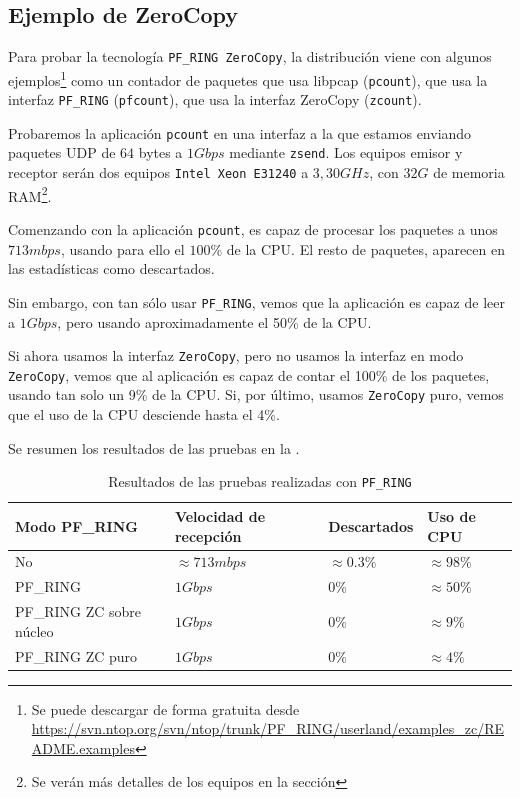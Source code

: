 \subsection{Ejemplo de ZeroCopy}
Para probar la tecnología \texttt{PF\_RING ZeroCopy}, la distribución viene con algunos ejemplos\footnote{Se puede 
descargar de forma gratuita desde 
\url{https://svn.ntop.org/svn/ntop/trunk/PF_RING/userland/examples_zc/README.examples}} como un contador de paquetes 
que usa libpcap (\texttt{pcount}), que usa la interfaz \texttt{PF\_RING} (\texttt{pfcount}), que usa 
la interfaz ZeroCopy (\texttt{zcount}).

Probaremos la aplicación \texttt{pcount} en una interfaz a la que estamos enviando paquetes UDP de $64$ bytes a $1Gbps$ 
mediante \texttt{zsend}. Los equipos emisor y receptor serán dos equipos \texttt{Intel\textregistered{} 
Xeon\textregistered{} E31240} a $3,30GHz$, con $32G$ de memoria RAM\footnote{Se verán más detalles de los equipos en la 
sección }.

Comenzando con la aplicación \texttt{pcount}, es capaz de procesar los paquetes a unos $713mbps$, usando para ello el 
$100\%$ de la CPU. El resto de paquetes,  aparecen en las estadísticas como descartados.

Sin embargo, con tan sólo usar \texttt{PF\_RING}, vemos que la aplicación es capaz de leer a $1Gbps$, pero usando 
aproximadamente el 50\% de la CPU.

Si ahora usamos la interfaz \texttt{ZeroCopy}, pero no usamos la interfaz en modo \texttt{ZeroCopy}, vemos que al 
aplicación es capaz de contar el 100\% de los paquetes, usando tan solo un 9\% de la CPU. Si, por último, usamos 
\texttt{ZeroCopy} puro, vemos que el uso de la CPU desciende hasta el 4\%.

Se resumen los resultados de las pruebas en la .

\begin{table}[htbp]
 \begin{tabular}{llll}
  Modo PF\_RING & Velocidad de recepción & Descartados  & Uso de CPU              \\\hline
  No                       & $\approx 713mbps$ & $\approx0.3\%$  & $\approx{}98\%$ \\
  PF\_RING                 & $1Gbps$           & $0\%$           & $\approx{}50\%$ \\
  PF\_RING ZC sobre núcleo & $1Gbps$           & $0\%$           & $\approx{}9\%$  \\
  PF\_RING ZC puro         & $1Gbps$           & $0\%$           & $\approx{}4\%$
\end{tabular}
  \caption{Resultados de las pruebas realizadas con \texttt{PF\_RING}}
\end{table}


